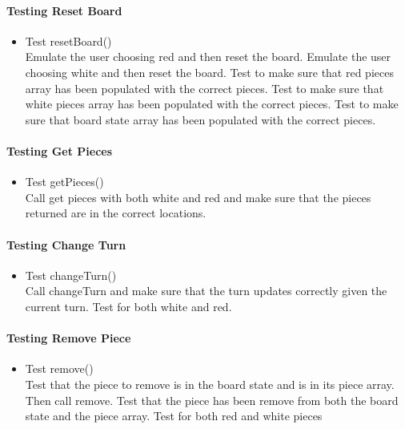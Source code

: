 \documentclass[12pt, titlepage]{article}
\begin{document}
\paragraph{Testing Reset Board}
\begin{itemize}
    \item Test resetBoard()\\
    Emulate the user choosing red and then reset the board. Emulate the user choosing white and then reset the board. Test to make sure that red pieces array has been populated with the correct pieces. Test to make sure that white pieces array has been populated with the correct pieces. Test to make sure that board state array has been populated with the correct pieces.
\end{itemize}

\paragraph{Testing Get Pieces}
\begin{itemize}
    \item Test getPieces()\\
    Call get pieces with both white and red and make sure that the pieces returned are in the correct locations.
\end{itemize}

\paragraph{Testing Change Turn}
\begin{itemize}
    \item Test changeTurn()\\
    Call changeTurn and make sure that the turn updates correctly given the current turn. Test for both white and red.
\end{itemize}

\paragraph{Testing Remove Piece}
\begin{itemize}
    \item Test remove()\\
    Test that the piece to remove is in the board state and is in its piece array. Then call remove. Test that the piece has been remove from both the board state and the piece array. Test for both red and white pieces
\end{itemize}
\end{document}

